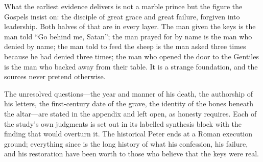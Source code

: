 What the earliest evidence delivers is not a marble prince but the figure the
Gospels insist on: the disciple of great grace and great failure, forgiven
into leadership. Both halves of that are in every layer. The man given the
keys is the man told ``Go behind me, Satan''; the man prayed for by name is
the man who denied by name; the man told to feed the sheep is the man asked
three times because he had denied three times; the man who opened the door to
the Gentiles is the man who backed away from their table. It is a strange
foundation, and the sources never pretend otherwise.

The unresolved questions---the year and manner of his death, the authorship
of his letters, the first-century date of the grave, the identity of the
bones beneath the altar---are stated in the appendix and left open, as
honesty requires. Each of the study's own judgments is set out in its
labelled synthesis block with the finding that would overturn it. The
historical Peter ends at a Roman execution ground; everything since is the
long history of what his confession, his failure, and his restoration have
been worth to those who believe that the keys were real.
